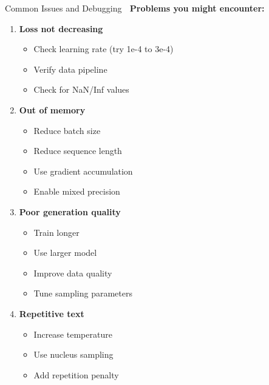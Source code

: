 \documentclass[aspectratio=169]{beamer}
\begin{document}
\begin{frame}[shrink=10]{Common Issues and Debugging 🔧}
    \textbf{Problems you might encounter:}

    \vspace{0.3cm}

    \begin{enumerate}\setlength{\itemsep}{0pt}
        \item \textbf{Loss not decreasing}
        \begin{itemize}\setlength{\itemsep}{0pt}
            \item Check learning rate (try 1e-4 to 3e-4)
            \item Verify data pipeline
            \item Check for NaN/Inf values
        \end{itemize}

        \item \textbf{Out of memory}
        \begin{itemize}\setlength{\itemsep}{0pt}
            \item Reduce batch size
            \item Reduce sequence length
            \item Use gradient accumulation
            \item Enable mixed precision
        \end{itemize}

        \item \textbf{Poor generation quality}
        \begin{itemize}\setlength{\itemsep}{0pt}
            \item Train longer
            \item Use larger model
            \item Improve data quality
            \item Tune sampling parameters
        \end{itemize}

        \item \textbf{Repetitive text}
        \begin{itemize}\setlength{\itemsep}{0pt}
            \item Increase temperature
            \item Use nucleus sampling
            \item Add repetition penalty
        \end{itemize}
    \end{enumerate}
\end{frame}
\end{document}
